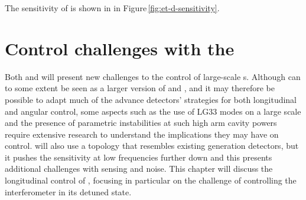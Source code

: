 The sensitivity of \ETHF{} is shown in  in Figure\,\ref{fig:et-d-sensitivity}.

\section{\label{sec:et-lf-control-challenges}Control challenges with the \ET{}}
Both \ETLF{} and \ETHF{} will present new challenges to the control of large-scale \DRFPMI{}s. Although \ETHF{} can to some extent be seen as a larger version of \ALIGO{} and \AVIRGO{}, and it may therefore be possible to adapt much of the advance detectors' strategies for both longitudinal and angular control, some aspects such as the use of LG33 modes on a large scale and the presence of parametric instabilities at such high arm cavity powers \cite{Evans2015} require extensive research to understand the implications they may have on control. \ETLF{} will also use a topology that resembles existing generation detectors, but it pushes the sensitivity at low frequencies further down and this presents additional challenges with sensing and noise. This chapter will discuss the longitudinal control of \ETLF{}, focusing in particular on the challenge of controlling the interferometer in its detuned state.

